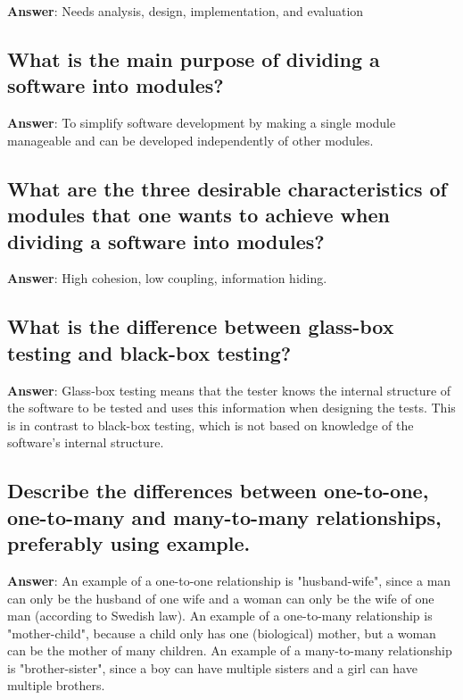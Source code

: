 \documentclass[a4paper,11pt,oneside]{article}
\begin{document}
\begin{sloppypar}
\label{q:226:sa:en:True}

\textbf{Answer}: Needs analysis, design, implementation, and evaluation



\subsection{What is the main purpose of dividing a software into modules?}

\label{q:227:sa:en:True}

\textbf{Answer}: To simplify software development by making a single module manageable and can be developed independently of other modules.



\subsection{What are the three desirable characteristics of modules that one wants to achieve when dividing a software into modules?}

\label{q:228:sa:en:True}

\textbf{Answer}: High cohesion, low coupling, information hiding.



\subsection{What is the difference between glass-box testing and black-box testing?}

\label{q:229:sa:en:True}

\textbf{Answer}: Glass-box testing means that the tester knows the internal structure of the software to be tested and uses this information when designing the tests. This is in contrast to black-box testing, which is not based on knowledge of the software's internal structure.



\subsection{Describe the differences between one-to-one, one-to-many and many-to-many relationships, preferably using example.}

\label{q:230:sa:en:True}

\textbf{Answer}: An example of a one-to-one relationship is "husband-wife", since a man can only be the husband of one wife and a woman can only be the wife of one man (according to Swedish law). An example of a one-to-many relationship is "mother-child", because a child only has one (biological) mother, but a woman can be the mother of many children. An example of a many-to-many relationship is "brother-sister", since a boy can have multiple sisters and a girl can have multiple brothers.




\end{sloppypar}
\end{document}
